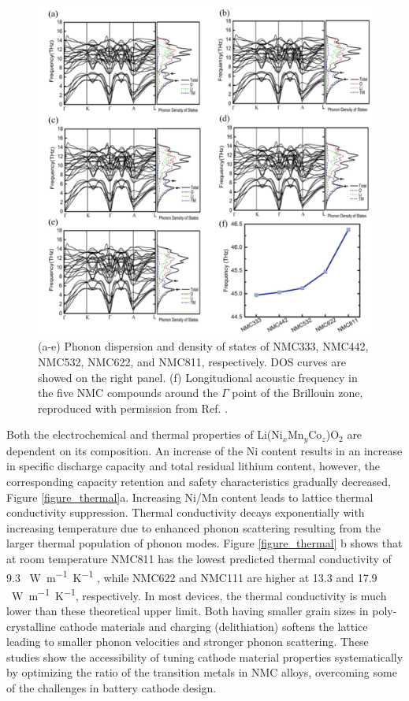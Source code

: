 \documentclass[journal=jacsat,manuscript=article]{achemso}
\begin{document}
\begin{figure}[]
  \centering
    \includegraphics[width=15cm]{Figures/P_phonon.png}
    \caption{(a-e) Phonon dispersion and density of states of NMC333, NMC442, NMC532, NMC622, and NMC811, respectively. DOS curves are showed on the right panel. (f) Longitudional acoustic frequency in the five NMC compounds around the $\Gamma$ point of the Brillouin zone, reproduced with permission from Ref. .}
  \label{figure_phonon}
\end{figure}

Both the electrochemical and thermal properties of Li(Ni$_x$Mn$_y$Co$_z$)O$_2$ are dependent on its composition.
An increase of the Ni content results in an increase in speciﬁc discharge capacity and total residual lithium content, however, the corresponding capacity retention and safety characteristics gradually decreased, Figure \ref{figure_thermal}a. \cite{noh2013comparison} 
Increasing Ni/Mn content leads to lattice thermal conductivity suppression.\cite{yang2020chemical} Thermal conductivity decays exponentially with increasing temperature due to enhanced phonon scattering resulting from the larger thermal population of phonon modes. Figure \ref{figure_thermal} b shows that at room temperature NMC811 has the lowest predicted thermal conductivity of 9.3 \SI{}{W.m^{-1}.K^{-1}} , while NMC622 and NMC111 are higher at 13.3 and 17.9 \SI{}{W.m^{-1}.K^{-1}}, respectively. In most devices, the thermal conductivity is much lower than these theoretical upper limit.\cite{takahata2002thermal,chen2006thermal} Both having smaller grain sizes in poly-crystalline cathode materials and charging (delithiation) softens the lattice leading to smaller phonon velocities and stronger phonon scattering. \cite{feng2020quantum,xia2020high} These studies show the accessibility of tuning cathode material properties systematically by optimizing the ratio of the transition metals in NMC alloys, overcoming some of the challenges in battery cathode design.
\end{document}
